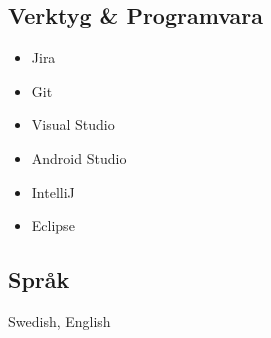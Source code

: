 \documentclass{article}
\begin{document}
\begin{minipage}[t]{0.28\textwidth}
		\subsection*{\textcolor{colorBlue}{Verktyg \& Programvara}}
		\begin{itemize}
			\item Jira
			\item Git
			\item Visual Studio
			\item Android Studio
			\item IntelliJ
			\item Eclipse
		\end{itemize}
		\vspace{-10pt} %
		\subsection*{\textcolor{colorBlue}{Språk}}
		Swedish, English
	\end{minipage}
	
\vspace{40pt} %
\end{document}
